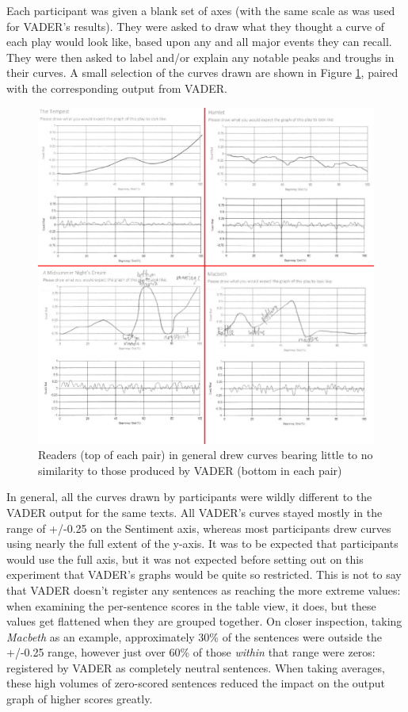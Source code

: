 \documentclass{article}
\begin{document}
{            Each participant was given a blank set of axes (with the same scale as was used for VADER's results). They were asked to draw what they thought a curve of each play would look like, based upon any and all major events they can recall. They were then asked to label and/or explain any notable peaks and troughs in their curves. A small selection of the curves drawn are shown in Figure \ref{fig:readerVsVader}, paired with the corresponding output from VADER.
            \begin{figure}[htbp]
                \includegraphics[width=1\textwidth]{Figures/Survey/readerVsVader}
                \centering
                \caption{Readers (top of each pair) in general drew curves bearing little to no similarity to those produced by VADER (bottom in each pair)}
                \label{fig:readerVsVader}
            \end{figure}
            In general, all the curves drawn by participants were wildly different to the VADER output for the same texts. All VADER's curves stayed mostly in the range of +/-0.25 on the Sentiment axis, whereas most participants drew curves using nearly the full extent of the y-axis. It was to be expected that participants would use the full axis, but it was not expected before setting out on this experiment that VADER's graphs would be quite so restricted. This is not to say that VADER doesn't register any sentences as reaching the more extreme values: when examining the per-sentence scores in the table view, it does, but these values get flattened when they are grouped together. On closer inspection, taking \textit{Macbeth} as an example, approximately 30\% of the sentences were outside the +/-0.25 range, however  just over 60\% of those \textit{within} that range were zeros: registered by VADER as completely neutral sentences. When taking averages, these high volumes of zero-scored sentences reduced the impact on the output graph of higher scores greatly.

}
\end{document}
